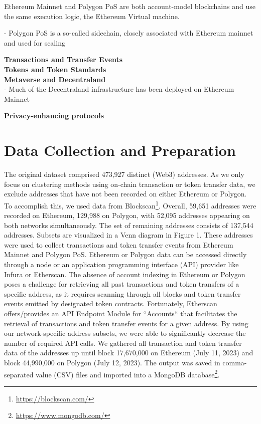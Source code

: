 \documentclass[12pt,a4paper,titlepage,oneside,english]{article}
\begin{document}
Ethereum Mainnet and Polygon PoS are both account-model blockchains and use the same execution logic, the Ethereum Virtual machine. 


- Polygon PoS is a so-called sidechain, closely associated with Ethereum mainnet and used for scaling



\textbf{Transactions and Transfer Events}\\

\textbf{Tokens and Token Standards}\\

\textbf{Metaverse and Decentraland} \\
- Much of the Decentraland infrastructure has been deployed on Ethereum Mainnet

\textbf{Privacy-enhancing protocols} \\




\section{Data Collection and Preparation}

The original dataset comprised 473,927 distinct (Web3) addresses. As we only focus on clustering methods using on-chain transaction or token transfer data, we exclude addresses that have not been recorded on either Ethereum or Polygon. To accomplish this, we used data from Blockscan\footnote{\url{https://blockscan.com/}}. Overall, 59,651 addresses were recorded on Ethereum, 129,988 on Polygon, with 52,095 addresses appearing on both networks simultaneously. The set of remaining addresses consists of 137,544 addresses. Subsets are visualized in a Venn diagram in Figure 1. 
These addresses were used to collect transactions and token transfer events from Ethereum Mainnet and Polygon PoS. Ethereum or Polygon data can be accessed directly through a node or an application programming interface (API) provider like Infura or Etherscan. The absence of account indexing in Ethereum or Polygon poses a challenge for retrieving all past transactions and token transfers of a specific address, as it requires scanning through all blocks and token transfer events emitted by designated token contracts. Fortunately, Etherscan offers/provides an API Endpoint Module for ``Accounts`` that facilitates the retrieval of transactions and token transfer events for a given address. By using our network-specific address subsets, we were able to significantly decrease the number of required API calls. 
We gathered all transaction and token transfer data of the addresses up until block 17,670,000 on Ethereum (July 11, 2023) and block 44,990,000 on Polygon (July 12, 2023). The output was saved in comma-separated value (CSV) files and imported into a MongoDB database\footnote{\url{https://www.mongodb.com/}}.
\end{document}

